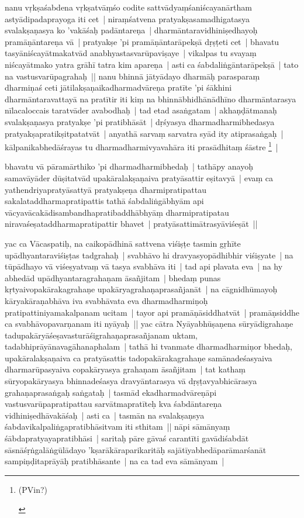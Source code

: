 \documentclass[article,12pt,a4paper]{memoir}
\begin{document}
\label{thakur75-62.6} nanu vṛkṣaśabdena vṛkṣatvāṃśo codite sattvādyaṃśaniścayanārtham astyādipadaprayoga iti cet | \label{thakur75-62.8} niraṃśatvena pratyakṣasamadhigatasya svalakṣaṇasya ko 'vakāśaḥ padāntareṇa | dharmāntaravidhiniṣedhayoḥ pramāṇāntareṇa vā | pratyakṣe 'pi pramāṇāntarāpekṣā dṛṣṭeti cet | bhavatu tasyāniścayātmakatvād anabhyastasvarūpaviṣaye | vikalpas tu svayaṃ niścayātmako yatra grāhī tatra kim apareṇa | asti ca śabdaliṅgāntarāpekṣā | tato na vastusvarūpagrahaḥ || \label{thakur75-62.13} nanu bhinnā jātyādayo dharmāḥ parasparaṃ dharmiṇaś ceti jātilakṣaṇaikadharmadvāreṇa pratīte 'pi śākhini dharmāntaravattayā na pratītir iti kiṃ na bhinnābhidhānādhīno dharmāntarasya nīlacaloccais taratvāder avabodhaḥ | tad etad asaṅgatam | akhaṇḍātmanaḥ svalakṣaṇasya pratyakṣe 'pi pratibhāsāt | dṛśyasya dharmadharmibhedasya pratyakṣapratikṣitpatatvāt | anyathā sarvaṃ sarvatra syād ity atiprasaṅgaḥ | kālpanikabhedāśrayas tu dharmadharmivyavahāra iti prasādhitaṃ śāstre \footnote{\begin{english}(PVin?)\end{english}} |
	\pend
      

	  \pstart bhavatu vā pāramārthiko 'pi dharmadharmibhedaḥ | tathāpy anayoḥ samavāyāder dūṣitatvād upakāralakṣaṇaiva pratyāsattir eṣitavyā | evaṃ ca yathendriyapratyāsattyā pratyakṣeṇa dharmipratipattau sakalataddharmapratipattis tathā śabdaliṅgābhyām api vācyavācakādisambandhapratibaddhābhyāṃ dharmipratipatau niravaśeṣataddharmapratipattir bhavet | pratyāsattimātrasyāviśeṣāt ||
	\pend
      

	  \pstart yac ca Vācaspatiḥ, na caikopādhinā sattvena viśiṣṭe tasmin gṛhīte upādhyantaraviśiṣṭas tadgrahaḥ | svabhāvo hi dravyasyopādhibhir viśiṣyate | na tūpādhayo vā viśeṣyatvaṃ vā tasya svabhāva iti | tad api plavata eva | na hy abhedād upādhyantaragrahaṇam āsañjitam | bhedaṃ punas kṛtyaivopakārakagrahaṇe upakāryagrahaṇaprasañjanāt | na cāgnidhūmayoḥ kāryakāraṇabhāva iva svabhāvata eva dharmadharmiṇoḥ pratipattiniyamakalpanam ucitam | tayor api pramāṇāsiddhatvāt | pramāṇsiddhe ca svabhāvopavarṇanam iti nyāyaḥ || \label{thakur75-63.3} yac cātra Nyāyabhūṣaṇena sūryādigrahaṇe tadupakāryāśeṣavasturāśigrahaṇaprasañjanam uktam, tadabhiprāyānavagāhanaphalam | tathā hi tvanmate dharmadharmiṇor bhedaḥ, upakāralakṣaṇaiva ca pratyāsattis tadopakārakagrahaṇe samānadeśasyaiva dharmarūpasyaiva copakāryasya grahaṇam āsañjitam | tat kathaṃ sūryopakāryasya bhinnadeśasya dravyāntarasya vā dṛṣṭavyabhicārasya grahaṇaprasaṅgaḥ saṅgataḥ | tasmād ekadharmadvāreṇāpi vastusvarūpapratipattau sarvātmapratīteḥ kva śabdāntareṇa vidhiniṣedhāvakāśaḥ | asti ca | tasmān na svalakṣaṇsya śabdavikalpaliṅgapratibhāsitvam iti sthitam || \label{thakur75-63.10} nāpi sāmānyaṃ śābdapratyayapratibhāsi | saritaḥ pāre gāvaś carantīti gavādiśabdāt sāsnāśṛṅgalāṅgūlādayo 'kṣarākāraparikaritāḥ sajātīyabhedāparāmarśanāt sampiṇḍitaprāyāḥ pratibhāsante | na ca tad eva sāmānyam |
	\pend
      
\end{document}
